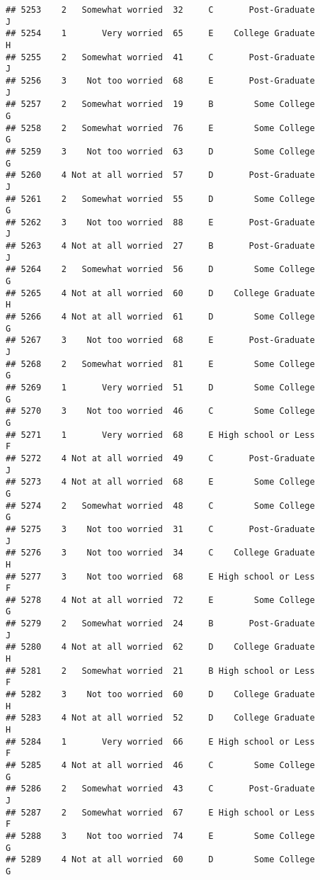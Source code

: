 \documentclass[
]{article}
\begin{document}
\begin{verbatim}
## 5253    2   Somewhat worried  32     C       Post-Graduate         J
## 5254    1       Very worried  65     E    College Graduate         H
## 5255    2   Somewhat worried  41     C       Post-Graduate         J
## 5256    3    Not too worried  68     E       Post-Graduate         J
## 5257    2   Somewhat worried  19     B        Some College         G
## 5258    2   Somewhat worried  76     E        Some College         G
## 5259    3    Not too worried  63     D        Some College         G
## 5260    4 Not at all worried  57     D       Post-Graduate         J
## 5261    2   Somewhat worried  55     D        Some College         G
## 5262    3    Not too worried  88     E       Post-Graduate         J
## 5263    4 Not at all worried  27     B       Post-Graduate         J
## 5264    2   Somewhat worried  56     D        Some College         G
## 5265    4 Not at all worried  60     D    College Graduate         H
## 5266    4 Not at all worried  61     D        Some College         G
## 5267    3    Not too worried  68     E       Post-Graduate         J
## 5268    2   Somewhat worried  81     E        Some College         G
## 5269    1       Very worried  51     D        Some College         G
## 5270    3    Not too worried  46     C        Some College         G
## 5271    1       Very worried  68     E High school or Less         F
## 5272    4 Not at all worried  49     C       Post-Graduate         J
## 5273    4 Not at all worried  68     E        Some College         G
## 5274    2   Somewhat worried  48     C        Some College         G
## 5275    3    Not too worried  31     C       Post-Graduate         J
## 5276    3    Not too worried  34     C    College Graduate         H
## 5277    3    Not too worried  68     E High school or Less         F
## 5278    4 Not at all worried  72     E        Some College         G
## 5279    2   Somewhat worried  24     B       Post-Graduate         J
## 5280    4 Not at all worried  62     D    College Graduate         H
## 5281    2   Somewhat worried  21     B High school or Less         F
## 5282    3    Not too worried  60     D    College Graduate         H
## 5283    4 Not at all worried  52     D    College Graduate         H
## 5284    1       Very worried  66     E High school or Less         F
## 5285    4 Not at all worried  46     C        Some College         G
## 5286    2   Somewhat worried  43     C       Post-Graduate         J
## 5287    2   Somewhat worried  67     E High school or Less         F
## 5288    3    Not too worried  74     E        Some College         G
## 5289    4 Not at all worried  60     D        Some College         G

\end{verbatim}
\end{document}

